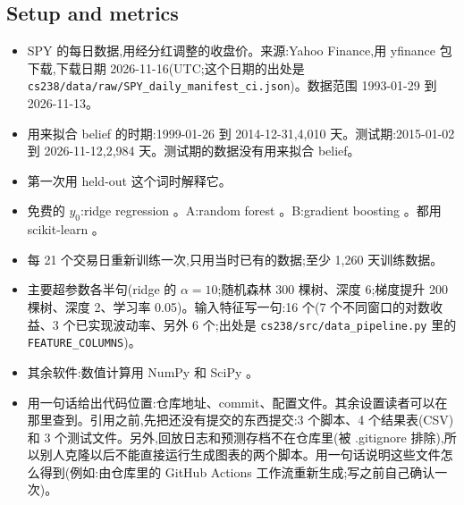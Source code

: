 \documentclass{article}
\newenvironment{pts}{\begin{itemize}[nosep,leftmargin=1.15em,topsep=1pt]}{\end{itemize}}
\begin{document}
\subsection{Setup and metrics}

\begin{note}[第 1 段,约 60 词:数据]
\begin{pts}
\item SPY 的每日数据,用经分红调整的收盘价。来源:Yahoo Finance,用 yfinance 包下载,下载日期 2026-11-16(UTC;这个日期的出处是 \texttt{cs238/data/raw/SPY\_daily\_manifest\_ci.json})。数据范围 1993-01-29 到 2026-11-13。
\item 用来拟合 belief 的时期:1999-01-26 到 2014-12-31,4{,}010 天。测试期:2015-01-02 到 2026-11-12,2{,}984 天。测试期的数据没有用来拟合 belief。
\item 第一次用 held-out 这个词时解释它。
\end{pts}
\end{note}

\begin{note}
\begin{pts}
\item 免费的 $y_0$:ridge regression \citep{hoerl1970ridge}。A:random forest \citep{breiman2001random}。B:gradient boosting \citep{friedman2001greedy}。都用 scikit-learn \citep{pedregosa2011scikit}。
\item 每 21 个交易日重新训练一次,只用当时已有的数据;至少 1{,}260 天训练数据。
\item 主要超参数各半句(ridge 的 $\alpha=10$;随机森林 300 棵树、深度 6;梯度提升 200 棵树、深度 2、学习率 0.05)。输入特征写一句:16 个(7 个不同窗口的对数收益、3 个已实现波动率、另外 6 个;出处是 \texttt{cs238/src/data\_pipeline.py} 里的 \texttt{FEATURE\_COLUMNS})。
\item 其余软件:数值计算用 NumPy \citep{harris2020numpy} 和 SciPy \citep{virtanen2020scipy}。
\item 用一句话给出代码位置:仓库地址、commit、配置文件。其余设置读者可以在那里查到。引用之前,先把还没有提交的东西提交:3 个脚本、4 个结果表(CSV)和 3 个测试文件。另外,回放日志和预测存档不在仓库里(被 .gitignore 排除),所以别人克隆以后不能直接运行生成图表的两个脚本。用一句话说明这些文件怎么得到(例如:由仓库里的 GitHub Actions 工作流重新生成;写之前自己确认一次)。
\end{pts}
\end{note}
\end{document}
